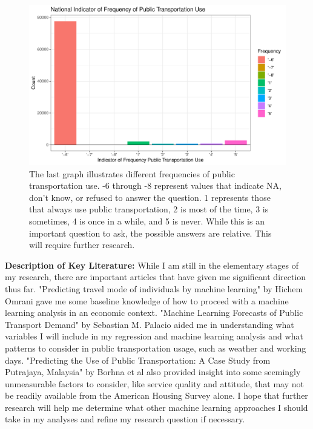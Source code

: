 \documentclass{article}
\begin{document}
\begin{figure}[H]
\centering
\includegraphics{Thesis_Proposal-010}
\caption{The last graph illustrates different frequencies of public transportation use. -6 through -8 represent values that indicate NA, don't know, or refused to answer the question. 1 represents those that always use public transportation, 2 is most of the time, 3 is sometimes, 4 is once in a while, and 5 is never. While this is an important question to ask, the possible answers are relative. This will require further research.}
\label{Figure 9}
\end{figure}
\textbf{Description of Key Literature:}
\newline While I am still in the elementary stages of my research, there are important articles that have given me significant direction thus far. "Predicting travel mode of individuals by machine learning" by Hichem Omrani gave me some baseline knowledge of how to proceed with a machine learning analysis in an economic context. "Machine Learning Forecasts of Public Transport Demand" by Sebastian M. Palacio aided me in understanding what variables I will include in my regression and machine learning analysis and what patterns to consider in public transportation usage, such as weather and working days. "Predicting the Use of Public Transportation: A Case Study from Putrajaya, Malaysia" by Borhna et al also provided insight into some seemingly unmeasurable factors to consider, like service quality and attitude, that may not be readily available from the American Housing Survey alone. I hope that further research will help me determine what other machine learning approaches I should take in my analyses and refine my research question if necessary. 
\end{document}
